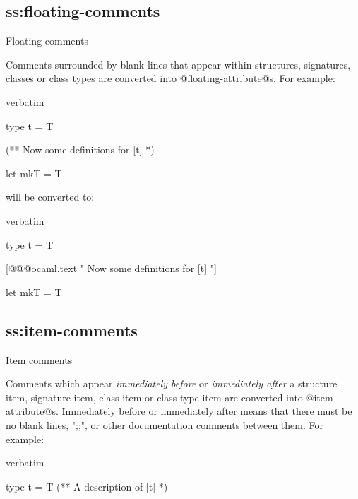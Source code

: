 {\subsection{ss:floating-comments}{Floating comments}

Comments surrounded by blank lines that appear within structures,
signatures, classes or class types are converted into
@floating-attribute@s. For example:

\begin{camlexample}{verbatim}
\begin{caml}
\begin{camlinput}
type t = T

(** Now some definitions for [t] *)

let mkT = T
\end{camlinput}
\end{caml}
\end{camlexample}

will be converted to:

\begin{camlexample}{verbatim}
\begin{caml}
\begin{camlinput}
type t = T

[@@@ocaml.text " Now some definitions for [t] "]

let mkT = T
\end{camlinput}
\end{caml}
\end{camlexample}

\subsection{ss:item-comments}{Item comments}

Comments which appear {\em immediately before} or {\em immediately
after} a structure item, signature item, class item or class type item
are converted into @item-attribute@s. Immediately before or immediately
after means that there must be no blank lines, ";;", or other
documentation comments between them. For example:

\begin{camlexample}{verbatim}
\begin{caml}
\begin{camlinput}
type t = T
(** A description of [t] *)

\end{camlinput}
\end{caml}
\end{camlexample}

}
